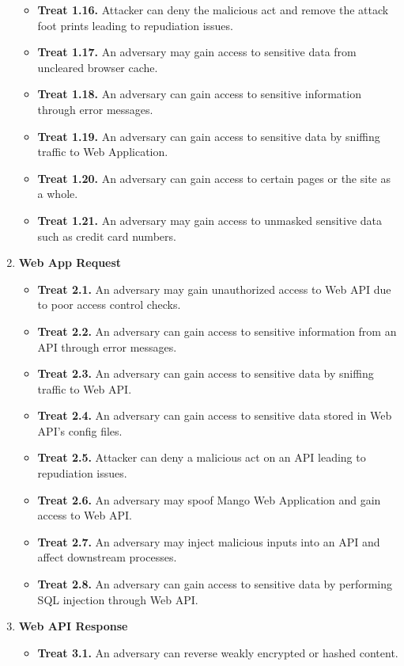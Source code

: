 \begin{enumerate}
\begin{itemize}
        \item \textbf{Treat 1.16.} Attacker can deny the malicious act and remove the attack foot prints leading to repudiation issues.
        \item \textbf{Treat 1.17.} An adversary may gain access to sensitive data from uncleared browser cache.
        \item \textbf{Treat 1.18.} An adversary can gain access to sensitive information through error messages.
        \item \textbf{Treat 1.19.} An adversary can gain access to sensitive data by sniffing traffic to Web Application.
        \item \textbf{Treat 1.20.} An adversary can gain access to certain pages or the site as a whole.
        \item \textbf{Treat 1.21.} An adversary may gain access to unmasked sensitive data such as credit card numbers.
    \end{itemize}
    \item \textbf{Web App Request}
    \begin{itemize}
        \item \textbf{Treat 2.1.} An adversary may gain unauthorized access to Web API due to poor access control checks.
        \item \textbf{Treat 2.2.} An adversary can gain access to sensitive information from an API through error messages.
        \item \textbf{Treat 2.3.} An adversary can gain access to sensitive data by sniffing traffic to Web API\@.
        \item \textbf{Treat 2.4.} An adversary can gain access to sensitive data stored in Web API's config files.
        \item \textbf{Treat 2.5.} Attacker can deny a malicious act on an API leading to repudiation issues.
        \item \textbf{Treat 2.6.} An adversary may spoof Mango Web Application and gain access to Web API\@.
        \item \textbf{Treat 2.7.} An adversary may inject malicious inputs into an API and affect downstream processes.
        \item \textbf{Treat 2.8.} An adversary can gain access to sensitive data by performing SQL injection through Web API\@.
    \end{itemize}
    \item \textbf{Web API Response}
    \begin{itemize}
        \item \textbf{Treat 3.1.} An adversary can reverse weakly encrypted or hashed content.

\end{itemize}
\end{enumerate}
